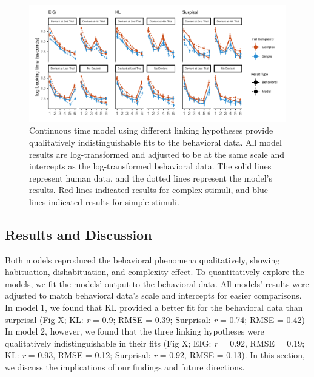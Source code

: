 \documentclass[10pt, letterpaper]{article}
\newenvironment{CodeChunk}{}{}
\begin{document}
\begin{CodeChunk}
\begin{figure}[h]

{\centering \includegraphics{figs/experiment_res-1} 

}

\caption[Continuous time model using different linking hypotheses provide qualitatively indistinguishable fits to the behavioral data]{Continuous time model using different linking hypotheses provide qualitatively indistinguishable fits to the behavioral data. All model results are log-transformed and adjusted to be at the same scale and intercepts as the log-transformed behavioral data. The solid lines represent human data, and the dotted lines represent the model's results. Red lines indicated results for complex stimuli, and blue lines indicated results for simple stimuli.}\label{fig:experiment_res}
\end{figure}
\end{CodeChunk}

\hypertarget{results-and-discussion}{%
\subsection{Results and Discussion}\label{results-and-discussion}}

Both models reproduced the behavioral phenomena qualitatively, showing
habituation, dishabituation, and complexity effect. To quantitatively
explore the models, we fit the models' output to the behavioral data.
All models' results were adjusted to match behavioral data's scale and
intercepts for easier comparisons. In model 1, we found that KL provided
a better fit for the behavioral data than surprisal (Fig X; KL: \emph{r}
= 0.9; RMSE = 0.39; Surprisal: \emph{r} = 0.74; RMSE = 0.42) In model 2,
however, we found that the three linking hypotheses were qualitatively
indistinguishable in their fits (Fig X; EIG: \emph{r} = 0.92, RMSE =
0.19; KL: \emph{r} = 0.93, RMSE = 0.12; Surprisal: \emph{r} = 0.92, RMSE
= 0.13). In this section, we discuss the implications of our findings
and future directions.
\end{document}
